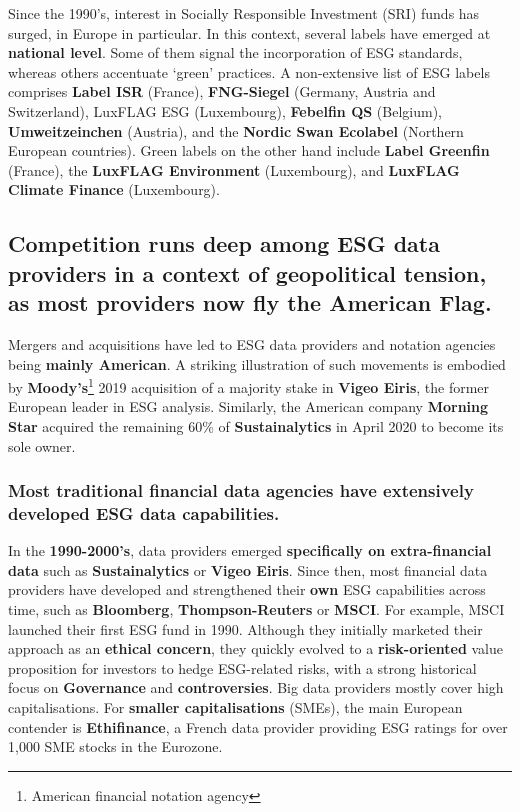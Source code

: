\documentclass[12pt]{report}
\begin{document}
Since the 1990’s, interest in Socially Responsible Investment (SRI) funds has surged, in Europe in particular. In this context, several labels have emerged at \textbf{national level}. Some of them signal the incorporation of ESG standards, whereas others accentuate ‘green’ practices. A non-extensive list of ESG labels comprises \textbf{Label ISR} (France), \textbf{FNG-Siegel} (Germany, Austria and Switzerland), LuxFLAG ESG (Luxembourg), \textbf{Febelfin QS} (Belgium), \textbf{Umweitzeinchen} (Austria), and the \textbf{Nordic Swan Ecolabel} (Northern European countries). Green labels on the other hand include \textbf{Label Greenfin} (France), the \textbf{LuxFLAG Environment} (Luxembourg), and \textbf{LuxFLAG Climate Finance }(Luxembourg). 


\subsection{Competition runs deep among ESG data providers in a context of geopolitical tension, as most providers now fly the American Flag.}

Mergers and acquisitions have led to ESG data providers and notation agencies being \textbf{mainly American}. A striking illustration of such movements is embodied by \textbf{Moody's}\footnote{American financial notation agency} 2019 acquisition of a majority stake in \textbf{Vigeo Eiris}, the former European leader in ESG analysis. Similarly, the American company \textbf{Morning Star} acquired the remaining 60\% of \textbf{Sustainalytics} in April 2020 to become its sole owner. 


\subsubsection{Most traditional financial data agencies have extensively developed ESG data capabilities.}

In the \textbf{1990-2000’s}, data providers emerged \textbf{specifically on extra-financial data} such as \textbf{Sustainalytics} or \textbf{Vigeo Eiris}. Since then, most financial data providers have developed and strengthened their \textbf{own} ESG capabilities across time, such as \textbf{Bloomberg}, \textbf{Thompson-Reuters} or \textbf{MSCI}. For example, MSCI launched their first ESG fund in 1990.\newline
Although they initially marketed their approach as an \textbf{ethical concern}, they quickly evolved to a \textbf{risk-oriented} value proposition for investors to hedge ESG-related risks, with a strong historical focus on \textbf{Governance} and \textbf{controversies}. 
Big data providers mostly cover high capitalisations. For \textbf{smaller capitalisations} (SMEs), the main European contender is \textbf{Ethifinance}, a French data provider providing ESG ratings for over 1,000 SME stocks in the Eurozone. 
\end{document}
